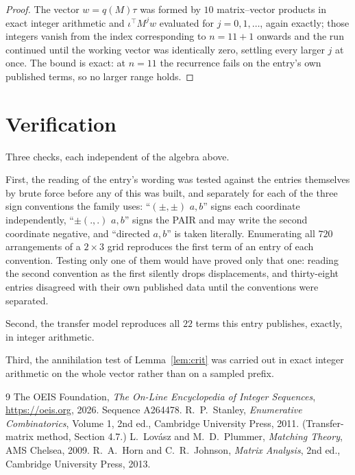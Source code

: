 \documentclass[11pt,a4paper]{article}
\theoremstyle{plain}
\theoremstyle{definition}
\begin{document}
\begin{proof}
The vector $w=q(M)\tau$ was formed by $10$ matrix--vector products in exact integer
arithmetic and $\iota^{\!\top}M^{j}w$ evaluated for $j=0,1,\dots$, again exactly; those
integers vanish from the index corresponding to $n=11+1$ onwards and the run continued
until the working vector was identically zero, settling every larger $j$ at once. The bound is exact: at $n=11$ the recurrence fails on the entry's own published terms, so no larger range holds.
\end{proof}

\section{Verification}

Three checks, each independent of the algebra above.

First, the reading of the entry's wording was tested against the entries themselves by brute
force before any of this was built, and separately for each of the three sign conventions the
family uses: ``$(\pm,\pm)$ $a,b$'' signs each coordinate independently, ``$\pm(.,.)$ $a,b$''
signs the PAIR and may write the second coordinate negative, and ``directed $a,b$'' is taken
literally. Enumerating all $720$ arrangements of a $2\times3$ grid reproduces the first term
of an entry of each convention. Testing only one of them would have proved only that one:
reading the second convention as the first silently drops displacements, and thirty-eight
entries disagreed with their own published data until the conventions were separated.

Second, the transfer model reproduces all $22$ terms this entry publishes, exactly, in
integer arithmetic.

Third, the annihilation test of Lemma~\ref{lem:crit} was carried out in exact integer
arithmetic on the whole vector rather than on a sampled prefix.

\begin{thebibliography}{9}
 The OEIS Foundation, \emph{The On-Line Encyclopedia of Integer
Sequences}, \url{https://oeis.org}, 2026. Sequence A264478.
 R.~P.~Stanley, \emph{Enumerative Combinatorics}, Volume 1, 2nd ed.,
Cambridge University Press, 2011. (Transfer-matrix method, Section 4.7.)
 L.~Lov\'asz and M.~D.~Plummer, \emph{Matching Theory}, AMS Chelsea, 2009.
 R.~A.~Horn and C.~R.~Johnson, \emph{Matrix Analysis}, 2nd ed., Cambridge
University Press, 2013.
\end{thebibliography}
\end{document}
